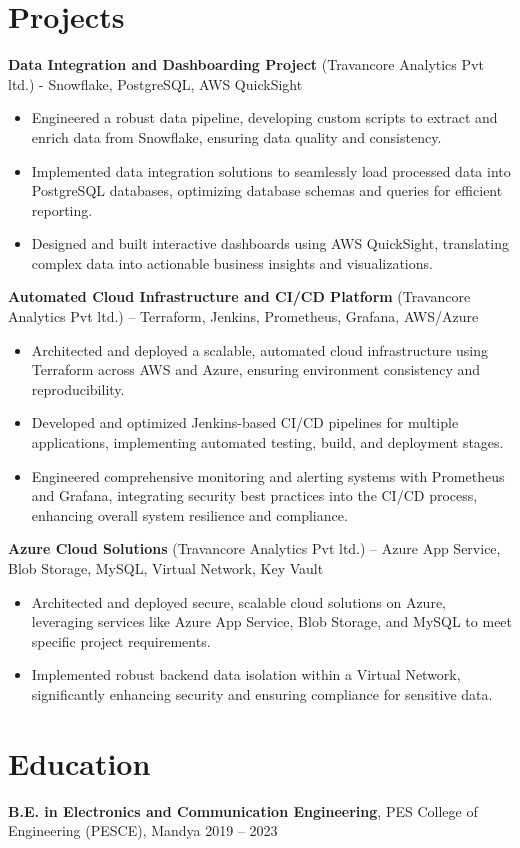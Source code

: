 \documentclass[a4paper]{article}
\begin{document}
\section*{Projects}
\textbf{Data Integration and Dashboarding Project} (Travancore Analytics Pvt ltd.) - Snowflake, PostgreSQL, AWS QuickSight
\begin{itemize}[leftmargin=0.25in, label=\textbullet]
    \item Engineered a robust data pipeline, developing custom scripts to extract and enrich data from Snowflake, ensuring data quality and consistency.
    \item Implemented data integration solutions to seamlessly load processed data into PostgreSQL databases, optimizing database schemas and queries for efficient reporting.
    \item Designed and built interactive dashboards using AWS QuickSight, translating complex data into actionable business insights and visualizations.
\end{itemize}


\textbf{Automated Cloud Infrastructure and CI/CD Platform} (Travancore Analytics Pvt ltd.) – Terraform, Jenkins, Prometheus, Grafana, AWS/Azure
\begin{itemize}[leftmargin=0.25in, label=\textbullet]
    \item Architected and deployed a scalable, automated cloud infrastructure using Terraform across AWS and Azure, ensuring environment consistency and reproducibility.
    \item Developed and optimized Jenkins-based CI/CD pipelines for multiple applications, implementing automated testing, build, and deployment stages.
    \item Engineered comprehensive monitoring and alerting systems with Prometheus and Grafana, integrating security best practices into the CI/CD process, enhancing overall system resilience and compliance.
\end{itemize}


\textbf{Azure Cloud Solutions} (Travancore Analytics Pvt ltd.) – Azure App Service, Blob Storage, MySQL, Virtual Network, Key Vault
\begin{itemize}[leftmargin=0.25in, label=\textbullet]
    \item Architected and deployed secure, scalable cloud solutions on Azure, leveraging services like Azure App Service, Blob Storage, and MySQL to meet specific project requirements.
    \item Implemented robust backend data isolation within a Virtual Network, significantly enhancing security and ensuring compliance for sensitive data.
\end{itemize}

\section*{Education}
\textbf{B.E. in Electronics and Communication Engineering}, PES College of Engineering (PESCE), Mandya \hfill 2019 – 2023
\end{document}
